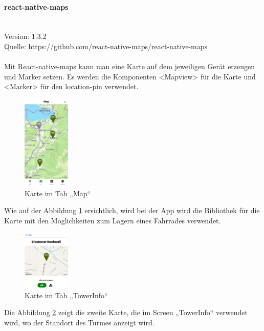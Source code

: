 \paragraph{react-native-maps}\mbox{}\\
Version: 1.3.2\\
Quelle: https://github.com/react-native-maps/react-native-maps\\ \\
Mit React-native-maps kann man eine Karte auf dem jeweiligen Gerät erzeugen und Marker setzen. Es werden die Komponenten <Mapview> für die Karte und <Marker> für den location-pin verwendet.  \\
\begin{figure}[H]
  \centering
  \includegraphics[width=0.2\textwidth]{images/app-screenshots/tabmap.jpg}
  \caption{Karte im Tab „Map“}
  \label{fig:tabmap}
\end{figure}
Wie auf der Abbildung \ref*{fig:tabmap} ersichtlich, wird bei der App wird die Bibliothek für die Karte mit den Möglichkeiten zum Lagern eines Fahrrades verwendet. \\
\begin{figure}[H]
  \centering
  \includegraphics[width=0.2\textwidth]{images/app-screenshots/smallmap.png}
  \caption{Karte im Tab „TowerInfo“}
  \label{fig:smallmap}
\end{figure}
Die Abbildung \ref{fig:smallmap} zeigt die zweite Karte, die im Screen „TowerInfo“ verwendet wird, wo der Standort des Turmes anzeigt wird.\\


